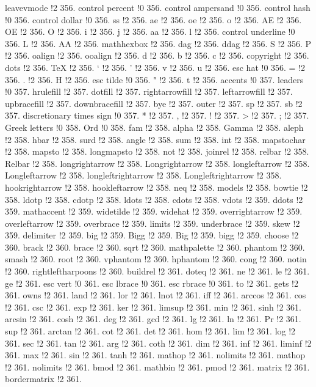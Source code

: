 leavevmode !2 356.
control percent !0 356.
control ampersand !0 356.
control hash !0 356.
control dollar !0 356.
ss !2 356.
ae !2 356.
oe !2 356.
o !2 356.
AE !2 356.
OE !2 356.
O !2 356.
i !2 356.
j !2 356.
aa !2 356.
l !2 356.
control underline !0 356.
L !2 356.
AA !2 356.
mathhexbox !2 356.
dag !2 356.
ddag !2 356.
S !2 356.
P !2 356.
oalign !2 356.
ooalign !2 356.
d !2 356.
b !2 356.
c !2 356.
copyright !2 356.
dots !2 356.
TeX !2 356.
` !2 356.
' !2 356.
v !2 356.
u !2 356.
esc hat !0 356.
= !2 356.
. !2 356.
H !2 356.
esc tilde !0 356.
" !2 356.
t !2 356.
accents !0 357.
leaders !0 357.
hrulefill !2 357.
dotfill !2 357.
rightarrowfill !2 357.
leftarrowfill !2 357.
upbracefill !2 357.
downbracefill !2 357.
bye !2 357.
outer !2 357.
sp !2 357.
sb !2 357.
discretionary times sign !0 357.
* !2 357.
, !2 357.
! !2 357.
> !2 357.
; !2 357.
Greek letters !0 358.
Ord !0 358.
fam !2 358.
alpha !2 358.
Gamma !2 358.
aleph !2 358.
hbar !2 358.
surd !2 358.
angle !2 358.
sum !2 358.
int !2 358.
mapstochar !2 358.
mapsto !2 358.
longmapsto !2 358.
not !2 358.
joinrel !2 358.
relbar !2 358.
Relbar !2 358.
longrightarrow !2 358.
Longrightarrow !2 358.
longleftarrow !2 358.
Longleftarrow !2 358.
longleftrightarrow !2 358.
Longleftrightarrow !2 358.
hookrightarrow !2 358.
hookleftarrow !2 358.
neq !2 358.
models !2 358.
bowtie !2 358.
ldotp !2 358.
cdotp !2 358.
ldots !2 358.
cdots !2 358.
vdots !2 359.
ddots !2 359.
mathaccent !2 359.
widetilde !2 359.
widehat !2 359.
overrightarrow !2 359.
overleftarrow !2 359.
overbrace !2 359.
limits !2 359.
underbrace !2 359.
skew !2 359.
delimiter !2 359.
big !2 359.
Bigg !2 359.
Big !2 359.
bigg !2 359.
choose !2 360.
brack !2 360.
brace !2 360.
sqrt !2 360.
mathpalette !2 360.
phantom !2 360.
smash !2 360.
root !2 360.
vphantom !2 360.
hphantom !2 360.
cong !2 360.
notin !2 360.
rightleftharpoons !2 360.
buildrel !2 361.
doteq !2 361.
ne !2 361.
le !2 361.
ge !2 361.
esc vert !0 361.
esc lbrace !0 361.
esc rbrace !0 361.
to !2 361.
gets !2 361.
owns !2 361.
land !2 361.
lor !2 361.
lnot !2 361.
iff !2 361.
arccos !2 361.
cos !2 361.
csc !2 361.
exp !2 361.
ker !2 361.
limsup !2 361.
min !2 361.
sinh !2 361.
arcsin !2 361.
cosh !2 361.
deg !2 361.
gcd !2 361.
lg !2 361.
ln !2 361.
Pr !2 361.
sup !2 361.
arctan !2 361.
cot !2 361.
det !2 361.
hom !2 361.
lim !2 361.
log !2 361.
sec !2 361.
tan !2 361.
arg !2 361.
coth !2 361.
dim !2 361.
inf !2 361.
liminf !2 361.
max !2 361.
sin !2 361.
tanh !2 361.
mathop !2 361.
nolimits !2 361.
mathop !2 361.
nolimits !2 361.
bmod !2 361.
mathbin !2 361.
pmod !2 361.
matrix !2 361.
bordermatrix !2 361.
